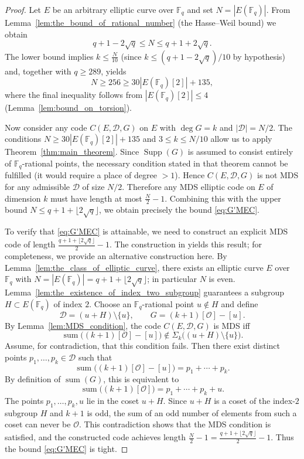 \documentclass[journal,12pt,onecolumn]{IEEEtran}
\newcommand{\Point}{\operatorname{sum}}
\newcommand{\sumset}{\Sigma}
\begin{document}
\begin{proof}
Let $E$ be an arbitrary elliptic curve over $\mathbb{F}_q$ and set $N = |E(\mathbb{F}_q)|$.  
From Lemma~\ref{lem:the_bound_of_rational_number} (the Hasse–Weil bound) we obtain
\[
q+1-2\sqrt{q} \le N \le q+1+2\sqrt{q}.
\]
The lower bound implies $k \le \frac{N}{10}$ (since $k \le (q+1-2\sqrt{q})/10$ by hypothesis) and, together with $q\ge 289$, yields
\[
N \ge 256 \ge 30|E(\mathbb{F}_q)[2]| + 135,
\]
where the final inequality follows from $|E(\mathbb{F}_q)[2]|\le 4$ (Lemma~\ref{lem:bound_on_torsion}).  

Now consider any code $C(E,\mathcal{D},G)$ on $E$ with $\deg G = k$ and $|\mathcal{D}| = N/2$.  
The conditions $N \ge 30|E(\mathbb{F}_q)[2]|+135$ and $3\le k\le N/10$ allow us to apply Theorem~\ref{thm:main_theorem}.  
Since $\operatorname{Supp}(G)$ is assumed to consist entirely of $\mathbb{F}_q$-rational points, the necessary condition stated in that theorem cannot be fulfilled (it would require a place of degree $>1$).  
Hence $C(E,\mathcal{D},G)$ is not MDS for any admissible $\mathcal{D}$ of size $N/2$.  
Therefore any MDS elliptic code on $E$ of dimension $k$ must have length at most $\frac{N}{2}-1$.  
Combining this with the upper bound $N \le q+1+\lfloor 2\sqrt{q}\rfloor$, we obtain precisely the bound \eqref{eq:G'MEC}.

To verify that \eqref{eq:G'MEC} is attainable, we need to construct an explicit MDS code of length $\frac{q+1+\lfloor 2\sqrt{q}\rfloor}{2}-1$. {\color{blue}The construction in \cite{wang2025nonreedsolomontypemdscodes} yields this result; for completeness, we provide an alternative construction here. } By Lemma~\ref{lem:the_class_of_elliptic_curve}, there exists an elliptic curve $E$ over $\mathbb{F}_q$ with
$N = |E(\mathbb{F}_q)| = q+1+\lfloor 2\sqrt{q}\rfloor$; in particular $N$ is even.  
Lemma~\ref{lem:the_existence_of_index_two_subgroup} guarantees a subgroup $H \subset E(\mathbb{F}_q)$ of index $2$.  
Choose an $\mathbb{F}_q$-rational point $u \notin H$ and define
\[
\mathcal{D} = (u + H) \setminus \{u\}, \qquad G = (k+1)[\mathcal{O}] - [u].
\]
By Lemma~\ref{lem:MDS_condition}, the code $C(E, \mathcal{D}, G)$ is MDS iff
\[
\Point\bigl((k+1)[\mathcal{O}] - [u]\bigr) \notin \sumset_k\bigl((u+H) \setminus \{u\}\bigr).
\]
Assume, for contradiction, that this condition fails.  
Then there exist distinct points $p_1, \dots, p_k \in \mathcal{D}$ such that
\[
\Point\bigl((k+1)[\mathcal{O}] - [u]\bigr) = p_1 + \cdots + p_k.
\]
By definition of $\Point(G)$, this is equivalent to
\[
\Point\bigl((k+1)[\mathcal{O}]\bigr) = p_1 + \cdots + p_k + u.
\]
The points $p_1,\dots,p_k,u$ lie in the coset $u+H$.  
Since $u+H$ is a coset of the index‑$2$ subgroup $H$ and $k+1$ is odd, the sum of an odd number of elements from such a coset can never be $\mathcal{O}$.  
This contradiction shows that the MDS condition is satisfied, and the constructed code achieves length $\frac{N}{2}-1 = \frac{q+1+\lfloor 2\sqrt{q}\rfloor}{2}-1$.  
Thus the bound \eqref{eq:G'MEC} is tight.
\end{proof}
\end{document}
